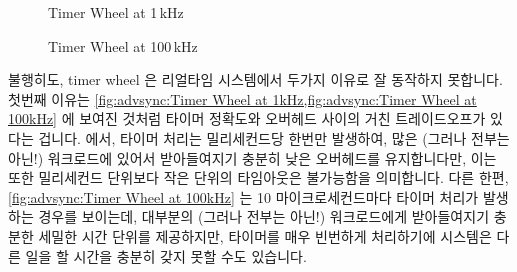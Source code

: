 \begin{figure}[tb]
\centering
{}
\caption{Timer Wheel at 1\,kHz}
\end{figure}

\begin{figure}[tb]
\centering
{}
\caption{Timer Wheel at 100\,kHz}
\end{figure}

불행히도, timer wheel 은 리얼타임 시스템에서 두가지 이유로 잘 동작하지
못합니다.
첫번째 이유는
\cref{fig:advsync:Timer Wheel at 1kHz,fig:advsync:Timer Wheel at 100kHz}
에 보여진 것처럼 타이머 정확도와 오버헤드 사이의 거친 트레이드오프가 있다는
겁니다.
 에서, 타이머 처리는 밀리세컨드당 한번만
발생하여, 많은 (그러나 전부는 아닌!) 워크로드에 있어서 받아들여지기 충분히 낮은
오버헤드를 유지합니다만, 이는 또한 밀리세컨드 단위보다 작은 단위의 타임아웃은
불가능함을 의미합니다.
다른 한편, \cref{fig:advsync:Timer Wheel at 100kHz} 는 10 마이크로세컨드마다
타이머 처리가 발생하는 경우를 보이는데, 대부분의 (그러나 전부는 아닌!)
워크로드에게 받아들여지기 충분한 세밀한 시간 단위를 제공하지만, 타이머를 매우
빈번하게 처리하기에 시스템은 다른 일을 할 시간을 충분히 갖지 못할 수도
있습니다.

